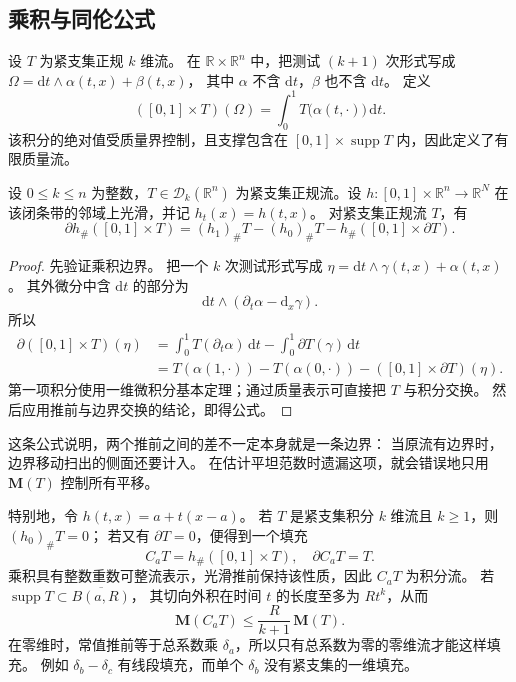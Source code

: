 \subsection{乘积与同伦公式}
\label{b1:subsec:D10304}

设 \(T\) 为紧支集正规 \(k\) 维流。
在 \(\mathbb R\times\mathbb R^n\) 中，把测试 \((k+1)\) 次形式写成
\(\Omega=\mathrm{d}t\wedge\alpha(t,x)+\beta(t,x)\)，
其中 \(\alpha\) 不含 \(\mathrm{d}t\)，\(\beta\) 也不含 \(\mathrm{d}t\)。
定义
\[
 ([0,1]\times T)(\Omega)=\int_0^1T\bigl(\alpha(t,\cdot)\bigr)\,\mathrm{d}t.
\]
该积分的绝对值受质量界控制，且支撑包含在
\([0,1]\times\operatorname{supp}T\) 内，因此定义了有限质量流。

\begin{proposition}\label{b1:prop:app-d-homotopy}
设 \(0\le k\le n\) 为整数，\(T\in\mathcal D_k(\mathbb R^n)\) 为紧支集正规流。设 \(h:[0,1]\times\mathbb R^n\to\mathbb R^N\)
在该闭条带的邻域上光滑，并记 \(h_t(x)=h(t,x)\)。
对紧支集正规流 \(T\)，有
\[
 \partial h_\#([0,1]\times T)
  =(h_1)_\#T-(h_0)_\#T-h_\#([0,1]\times\partial T).
\]
\end{proposition}
\begin{proof}
先验证乘积边界。
把一个 \(k\) 次测试形式写成
\(\eta=\mathrm{d}t\wedge\gamma(t,x)+\alpha(t,x)\)。
其外微分中含 \(\mathrm{d}t\) 的部分为
\[
 \mathrm{d}t\wedge(\partial_t\alpha-\mathrm{d}_x\gamma).
\]
所以
\[
 \begin{split}
 \partial([0,1]\times T)(\eta)
 &=\int_0^1 T(\partial_t\alpha)\,\mathrm{d}t
     -\int_0^1\partial T(\gamma)\,\mathrm{d}t\\
 &=T(\alpha(1,\cdot))-T(\alpha(0,\cdot))
     -([0,1]\times\partial T)(\eta).
 \end{split}
\]
第一项积分使用一维微积分基本定理；通过质量表示可直接把 \(T\) 与积分交换。
然后应用推前与边界交换的结论，即得公式。
\end{proof}

这条公式说明，两个推前之间的差不一定本身就是一条边界：
当原流有边界时，边界移动扫出的侧面还要计入。
在估计平坦范数时遗漏这项，就会错误地只用 \(\mathbf M(T)\) 控制所有平移。

\ProseParagraphBreak

特别地，令 \(h(t,x)=a+t(x-a)\)。
若 \(T\) 是紧支集积分 \(k\) 维流且 \(k\geq1\)，则
\((h_0)_\#T=0\)；
若又有 \(\partial T=0\)，便得到一个填充
\[
 C_aT=h_\#([0,1]\times T),\quad \partial C_aT=T.
\]
乘积具有整数重数可整流表示，光滑推前保持该性质，因此 \(C_aT\) 为积分流。
若 \(\operatorname{supp}T\subset\overline{B(a,R)}\)，
其切向外积在时间 \(t\) 的长度至多为 \(R t^k\)，从而
\[
 \mathbf M(C_aT)\leq\frac{R}{k+1}\,\mathbf M(T).
\]
在零维时，常值推前等于总系数乘 \(\delta_a\)，所以只有总系数为零的零维流才能这样填充。
例如 \(\delta_b-\delta_c\) 有线段填充，而单个 \(\delta_b\) 没有紧支集的一维填充。
